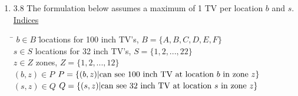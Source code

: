 \documentclass[10pt]{article}
\begin{document}
\begin{enumerate}

\newpage

\item 3.8 The formulation below assumes a maximum of 1 TV per location $b$ and $s$.\\

\noindent\underline{Indices}
\begin{tabbing}
\hspace{.5cm} \= $b\in B$ \hspace{2.5cm} \= locations for 100 inch TV's, $B=\{A,B,C,D,E,F\}$ \\
\> $s\in S$ \> locations for 32 inch TV's, $S=\{1,2,...,22\}$\\
\> $z\in Z$ \> zones, $Z=\{1,2,...,12\}$ \\
\> $(b,z)\in P$ \> $P=\{(b,z)| {\rm can~see~100~inch~TV~at~location}~b~{\rm in~zone}~z\}$ \\
\> $(s,z)\in Q$ \> $Q=\{(s,z)| {\rm can~see~32~inch~TV~at~location}~s~{\rm in~zone}~z\}$ \\


\end{tabbing}
\end{enumerate}
\end{document}
